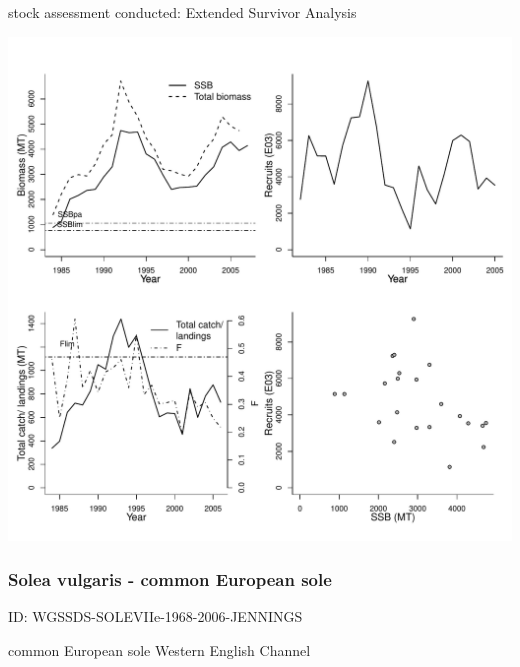 stock assessment conducted: Extended Survivor Analysis 
\begin{center}
\vspace{-0.2cm}\includegraphics[scale=0.65]{../tex/figures/plot-WGBFAS-SOLEIIIa-1982-2007-JENNINGS.pdf}
\end{center}

\newpage
\subsubsection{Solea vulgaris - common European sole}
ID: WGSSDS-SOLEVIIe-1968-2006-JENNINGS

common European sole Western English Channel 

